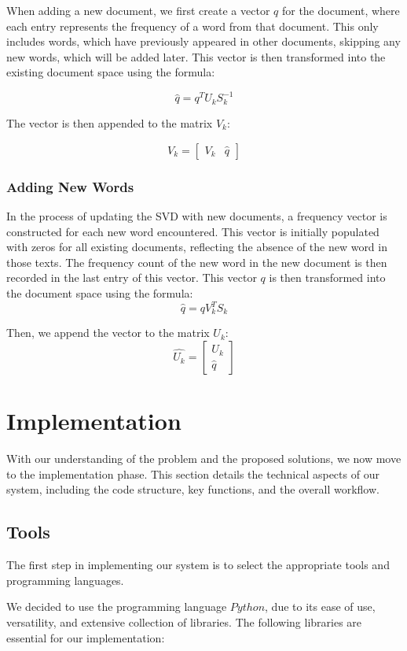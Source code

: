 \documentclass[12pt,a4paper]{article}
\begin{document}
When adding a new document, we first create a vector $q$ for the document, where each entry represents the frequency of a word from that document. This only includes words, which have previously appeared in other documents, skipping any new words, which will be added later. This vector is then transformed into the existing document space using the formula:

\[ \hat{q} = q^T U_k S^{-1}_k \]

\noindent The vector is then appended to the matrix $V_k$:

\[ \hat{V_k} = \begin{bmatrix} V_k & \hat{q} \end{bmatrix} \]

\subsubsection{Adding New Words}

In the process of updating the SVD with new documents, a frequency vector is constructed for each new word encountered. This vector is initially populated with zeros for all existing documents, reflecting the absence of the new word in those texts. The frequency count of the new word in the new document is then recorded in the last entry of this vector. This vector $q$ is then transformed into the document space using the formula:
\[ \hat{q} = q V^T_k S_k \]

\noindent Then, we append the vector to the matrix $U_k$:
\[ \hat{U_k} = \begin{bmatrix} U_k \\ \hat{q} \end{bmatrix} \]


\newpage
\section{Implementation}
    With our understanding of the problem and the proposed solutions, we now move to the implementation phase. This section details the technical aspects of our system, including the code structure, key functions, and the overall workflow.

    \subsection{Tools}
    The first step in implementing our system is to select the appropriate tools and programming languages. 
    
    \bigskip
    \noindent We decided to use the programming language $Python$, due to its ease of use, versatility, and extensive collection of libraries. The following libraries are essential for our implementation:
\end{document}
